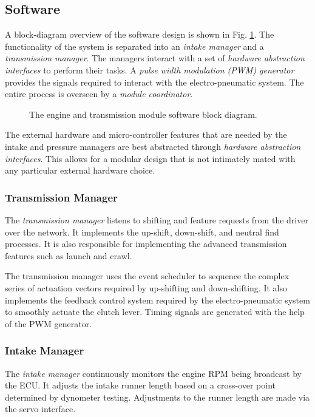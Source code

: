 \subsection{Software}

A block-diagram overview of the software design is shown in Fig. \ref{fig:engine_software_design_block}. The functionality of the system is separated into an \emph{intake manager} and a \emph{transmission manager}. The managers interact with a set of \emph{hardware abstraction interfaces} to perform their tasks. A \emph{pulse width modulation (PWM) generator} provides the signals required to interact with the electro-pneumatic system. The entire process is overseen by a \emph{module coordinator}.

\begin{figure}[H]
	\centering
	
	\caption{The engine and transmission module software block diagram.}
	\label{fig:engine_software_design_block}
\end{figure}

The external hardware and micro-controller features that are needed by the intake and pressure managers are best abstracted through \emph{hardware abstraction interfaces}. This allows for a modular design that is not intimately mated with any particular external hardware choice. 

\subsubsection{Transmission Manager}

The \emph{transmission manager} listens to shifting and feature requests from the driver over the network. It implements the up-shift, down-shift, and neutral find processes. It is also responsible for implementing the advanced transmission features such as launch and crawl.

The transmission manager uses the event scheduler to sequence the complex series of actuation vectors required by up-shifting and down-shifting. It also implements the feedback control system required by the electro-pneumatic system to smoothly actuate the clutch lever. Timing signals are generated with the help of the PWM generator.

\subsubsection{Intake Manager}

The \emph{intake manager} continuously monitors the engine RPM being broadcast by the ECU. It adjusts the intake runner length based on a cross-over point determined by dynometer testing. Adjustments to the runner length are made via the servo interface.


